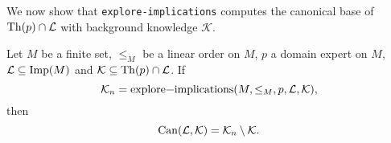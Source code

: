 We now show that \lstinline{explore-implications} computes the canonical base of $\operatorname{Th}(p)
\cap \mathcal{L}$ with background knowledge $\mathcal{K}$.

\begin{Theorem}
  \label{thm:explore-implications-computes-canonical-base}
  Let $M$ be a finite set, $\leq_{M}$ be a linear order on $M$, $p$ a domain expert on
  $M$, $\mathcal{L} \subseteq \operatorname{Imp}(M)$ and $\mathcal{K} \subseteq \operatorname{Th}(p) \cap
  \mathcal{L}$.  If
  \begin{equation*}
    \mathcal{K}_{n} = \text{\lstinline{explore-implications}}(M, \leq_{M}, p, \mathcal{L}, \mathcal{K}),
  \end{equation*}
  then
  \begin{equation*}
    \operatorname{Can}(\mathcal{L}, \mathcal{K}) = \mathcal{K}_{n} \setminus \mathcal{K}.
  \end{equation*}
\end{Theorem}

